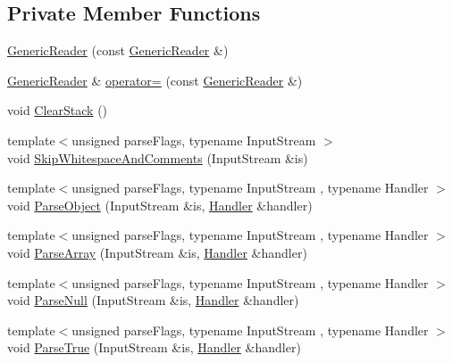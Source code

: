 \subsection*{Private Member Functions}
\begin{DoxyCompactItemize}
\item 
\mbox{\hyperlink{classrapidjson_1_1_generic_reader_a72f54ba6860fc86d114414709e11225f}{Generic\+Reader}} (const \mbox{\hyperlink{classrapidjson_1_1_generic_reader}{Generic\+Reader}} \&)
\item 
\mbox{\hyperlink{classrapidjson_1_1_generic_reader}{Generic\+Reader}} \& \mbox{\hyperlink{classrapidjson_1_1_generic_reader_a19d11492a976b8419fe12b3cc284347d}{operator=}} (const \mbox{\hyperlink{classrapidjson_1_1_generic_reader}{Generic\+Reader}} \&)
\item 
void \mbox{\hyperlink{classrapidjson_1_1_generic_reader_a8067bd11e56e539890d10b1817bf4602}{Clear\+Stack}} ()
\item 
{\footnotesize template$<$unsigned parse\+Flags, typename Input\+Stream $>$ }\\void \mbox{\hyperlink{classrapidjson_1_1_generic_reader_abfaf691ef4052e50a8af243df04bcf8f}{Skip\+Whitespace\+And\+Comments}} (Input\+Stream \&is)
\item 
{\footnotesize template$<$unsigned parse\+Flags, typename Input\+Stream , typename Handler $>$ }\\void \mbox{\hyperlink{classrapidjson_1_1_generic_reader_a47e01cfe5d49d6ee0da6ee4389626074}{Parse\+Object}} (Input\+Stream \&is, \mbox{\hyperlink{classrapidjson_1_1_handler}{Handler}} \&handler)
\item 
{\footnotesize template$<$unsigned parse\+Flags, typename Input\+Stream , typename Handler $>$ }\\void \mbox{\hyperlink{classrapidjson_1_1_generic_reader_ae1e8b2adc5ebfcb9b123058e4c726b89}{Parse\+Array}} (Input\+Stream \&is, \mbox{\hyperlink{classrapidjson_1_1_handler}{Handler}} \&handler)
\item 
{\footnotesize template$<$unsigned parse\+Flags, typename Input\+Stream , typename Handler $>$ }\\void \mbox{\hyperlink{classrapidjson_1_1_generic_reader_a369a2bce1f2ee28dee935aa40603080f}{Parse\+Null}} (Input\+Stream \&is, \mbox{\hyperlink{classrapidjson_1_1_handler}{Handler}} \&handler)
\item 
{\footnotesize template$<$unsigned parse\+Flags, typename Input\+Stream , typename Handler $>$ }\\void \mbox{\hyperlink{classrapidjson_1_1_generic_reader_a73752e4f8bd6c1108e0adabf02334fc7}{Parse\+True}} (Input\+Stream \&is, \mbox{\hyperlink{classrapidjson_1_1_handler}{Handler}} \&handler)

\end{DoxyCompactItemize}
